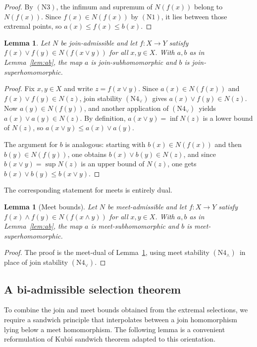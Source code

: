 \documentclass[11pt]{amsart}
\newtheorem{lemma}[theorem]{Lemma}
\theoremstyle{definition}
\newcommand{\join}{\vee}
\newcommand{\meet}{\wedge}
\newcommand{\NOne}{\ensuremath{\mathrm{(N1)}}}
\newcommand{\NThree}{\ensuremath{\mathrm{(N3)}}}
\newcommand{\NFourJoin}{\ensuremath{\mathrm{(N4_{\vee})}}}
\newcommand{\NFourMeet}{\ensuremath{\mathrm{(N4_{\wedge})}}}
\begin{document}
\begin{proof}
By \NThree, the infimum and supremum of $N(f(x))$ belong to $N(f(x))$.
Since $f(x)\in N(f(x))$ by \NOne, it lies between those extremal points, so $a(x)\le f(x)\le b(x)$.
\end{proof}

\begin{lemma}\label{lem:join-bounds}
Let $N$ be join-admissible and let $f\colon X\to Y$ satisfy $f(x)\join f(y)\in N(f(x\join y))$ for all $x,y\in X$.
With $a,b$ as in Lemma~\ref{lem:ab}, the map $a$ is join-subhomomorphic and $b$ is join-superhomomorphic.
\end{lemma}

\begin{proof}
Fix $x,y\in X$ and write $z=f(x\join y)$.
Since $a(x)\in N(f(x))$ and $f(x)\join f(y)\in N(z)$, join stability \NFourJoin\ gives $a(x)\join f(y)\in N(z)$.
Now $a(y)\in N(f(y))$, and another application of \NFourJoin\ yields $a(x)\join a(y)\in N(z)$.
By definition, $a(x\join y)=\inf N(z)$ is a lower bound of $N(z)$, so $a(x\join y)\le a(x)\join a(y)$.

The argument for $b$ is analogous: starting with $b(x)\in N(f(x))$ and then $b(y)\in N(f(y))$,
one obtains $b(x)\join b(y)\in N(z)$, and since $b(x\join y)=\sup N(z)$ is an upper bound of $N(z)$, one gets $b(x)\join b(y)\le b(x\join y)$.
\end{proof}
The corresponding statement for meets is entirely dual.

\begin{lemma}[Meet bounds]\label{lem:meet-bounds}
Let $N$ be meet-admissible and let $f\colon X\to Y$ satisfy $f(x)\meet f(y)\in N(f(x\meet y))$ for all $x,y\in X$.
With $a,b$ as in Lemma~\ref{lem:ab}, the map $a$ is meet-subhomomorphic and $b$ is meet-superhomomorphic.
\end{lemma}

\begin{proof}
The proof is the meet-dual of Lemma~\ref{lem:join-bounds}, using meet stability \NFourMeet\ in place of join stability \NFourJoin.
\end{proof}

\subsection{A bi-admissible selection theorem}
To combine the join and meet bounds obtained from the extremal selections, we require a
sandwich principle that interpolates between a join homomorphism lying below a meet
homomorphism.
The following lemma is a convenient reformulation of Kubi\'s sandwich theorem adapted to
this orientation.
\end{document}
